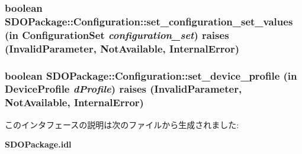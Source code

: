 \subsubsection[{set\_\-configuration\_\-set\_\-values}]{\setlength{\rightskip}{0pt plus 5cm}boolean SDOPackage::Configuration::set\_\-configuration\_\-set\_\-values (in {\bf ConfigurationSet} {\em configuration\_\-set})  raises (InvalidParameter, NotAvailable, InternalError)}\label{interfaceSDOPackage_1_1Configuration_a82d62dcfce26a9cf41bfa79a26a79fa5}
\subsubsection[{set\_\-device\_\-profile}]{\setlength{\rightskip}{0pt plus 5cm}boolean SDOPackage::Configuration::set\_\-device\_\-profile (in {\bf DeviceProfile} {\em dProfile})  raises (InvalidParameter, NotAvailable, InternalError)}\label{interfaceSDOPackage_1_1Configuration_a9bc9b647255e601b692eed2410e43927}


このインタフェースの説明は次のファイルから生成されました:\begin{DoxyCompactItemize}
\item 
{\bf SDOPackage.idl}\end{DoxyCompactItemize}
